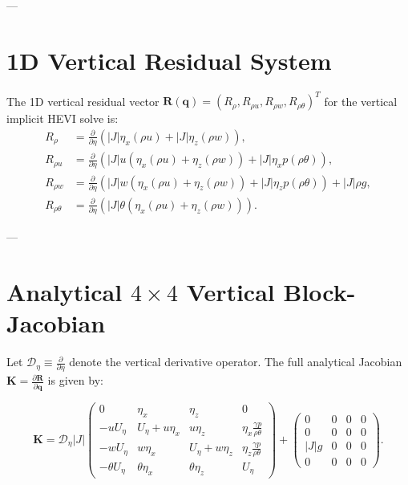 \documentclass[11pt,a4paper]{article}
\begin{document}
	---
	
	\section{1D Vertical Residual System}
	
	The 1D vertical residual vector $\mathbf{R}(\boldsymbol{q}) = (R_\rho, R_{\rho u}, R_{\rho w}, R_{\rho \theta})^T$ for the vertical implicit HEVI solve is:
	\begin{align}
		R_\rho &= \frac{\partial}{\partial \eta} \left( |J| \eta_x (\rho u) + |J| \eta_z (\rho w) \right), \\[6pt]
		R_{\rho u} &= \frac{\partial}{\partial \eta} \left( |J| u \left( \eta_x (\rho u) + \eta_z (\rho w) \right) + |J| \eta_x p(\rho\theta) \right), \\[6pt]
		R_{\rho w} &= \frac{\partial}{\partial \eta} \left( |J| w \left( \eta_x (\rho u) + \eta_z (\rho w) \right) + |J| \eta_z p(\rho\theta) \right) + |J| \rho g, \\[6pt]
		R_{\rho \theta} &= \frac{\partial}{\partial \eta} \left( |J| \theta \left( \eta_x (\rho u) + \eta_z (\rho w) \right) \right).
	\end{align}
	
	---
	
	\section{Analytical $4 \times 4$ Vertical Block-Jacobian}
	
	Let $\mathcal{D}_\eta \equiv \frac{\partial}{\partial \eta}$ denote the vertical derivative operator. The full analytical Jacobian $\mathbf{K} = \frac{\partial \mathbf{R}}{\partial \boldsymbol{q}}$ is given by:
	
	\begin{equation}
		\mathbf{K} = \mathcal{D}_\eta |J| \begin{pmatrix}
			0 & \eta_x & \eta_z & 0 \\[8pt]
			-u U_\eta & U_\eta + u \eta_x & u \eta_z & \eta_x \frac{\gamma p}{\rho\theta} \\[8pt]
			-w U_\eta & w \eta_x & U_\eta + w \eta_z & \eta_z \frac{\gamma p}{\rho\theta} \\[8pt]
			-\theta U_\eta & \theta \eta_x & \theta \eta_z & U_\eta
		\end{pmatrix} 
		+ \begin{pmatrix}
			0 & 0 & 0 & 0 \\[6pt]
			0 & 0 & 0 & 0 \\[6pt]
			|J| g & 0 & 0 & 0 \\[6pt]
			0 & 0 & 0 & 0
		\end{pmatrix}.
	\end{equation}
	
\end{document}
